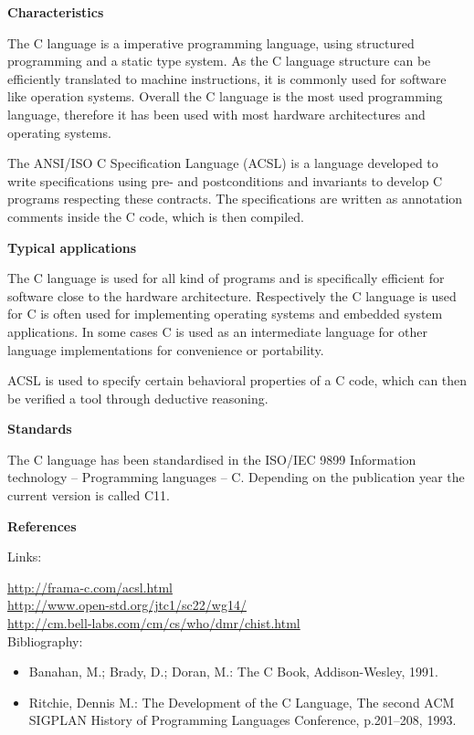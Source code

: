\documentclass{./template/openetcs_report}
\begin{document}
	\textbf{Characteristics}

The C language is a imperative programming language, using structured programming and a static type system. As the C language structure can be efficiently translated to machine instructions, it is commonly used for software like operation systems. Overall the C language is the most used programming language, therefore it has been used with most hardware architectures and operating systems.

The ANSI/ISO C Specification Language (ACSL) is a language developed to write specifications using pre- and postconditions and invariants to develop C programs respecting these contracts. The specifications are written as annotation comments inside the C code, which is then compiled.

	\textbf{Typical applications}

The C language is used for all kind of programs and is specifically efficient for software close to the hardware architecture. Respectively the C language is used for C is often used for implementing operating systems and embedded system applications. 
In some cases C is used as an intermediate language for other language implementations for convenience or portability.

ACSL is used to specify certain behavioral properties of a C code, which can then be verified a tool through deductive reasoning.

	\textbf{Standards}

The C language has been standardised in the ISO/IEC 9899 Information technology -- Programming languages -- C.
Depending on the publication year the current version is called C11.

	\textbf{References}

Links:

\url{http://frama-c.com/acsl.html} \\[4pt]
\url{http://www.open-std.org/jtc1/sc22/wg14/} \\[4pt]
\url{http://cm.bell-labs.com/cm/cs/who/dmr/chist.html} \\[4pt]


Bibliography:

\begin{itemize}
\item Banahan, M.; Brady, D.; Doran, M.: The C Book, Addison-Wesley, 1991.
\item Ritchie, Dennis M.: The Development of the C Language, The second ACM SIGPLAN History of Programming Languages Conference, p.201–208, 1993.
\end{itemize}
\end{document}
